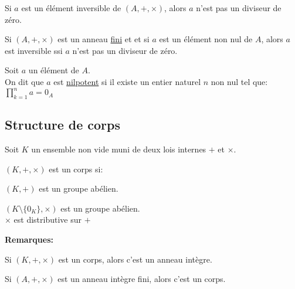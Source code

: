 \documentclass[12pt,twoside,a4paper]{article}
\begin{document}
			\begin{prop}
				\begin{liste}
					\item Si $a$ est un élément inversible de $(A,+,\times)$, alors $a$ n'est pas un diviseur de zéro.
					\item Si $(A,+,\times)$ est un anneau \underline{fini} et et si $a$ est un élément non nul de $A$, alors $a$ est inversible ssi $a$ n'est pas un diviseur de zéro.
				\end{liste}
			\end{prop}
			\begin{defi}
				Soit $a$ un élément de $A$.\\
				On dit que $a$ est \underline{nilpotent} si il existe un entier naturel $n$ non nul tel que:
				$\prod\limits_{k=1}^na=0_A$
			\end{defi}
		\subsection{Structure de corps}
			\begin{flushleft}
				Soit $K$ un ensemble non vide muni de deux lois internes $+$ et $\times$.
			\end{flushleft}
			\begin{defi}
				$(K,+,\times)$ est un corps si:
				\begin{liste}
					\item[\cercle1]$(K,+)$ est un groupe abélien.
					\item[\cercle2]$(K\setminus\{0_K\},\times)$ est un groupe abélien.\\
						$\times$ est distributive sur $+$
				\end{liste}
			\end{defi}
			\begin{flushleft}
				\textbf{Remarques:}
				\begin{liste}
					\item Si $(K,+,\times)$ est un corps, alors c'est un anneau intègre.
					\item Si $(A,+,\times)$ est un anneau intègre fini, alors c'est un corps.
				\end{liste}
			\end{flushleft}
\end{document}
